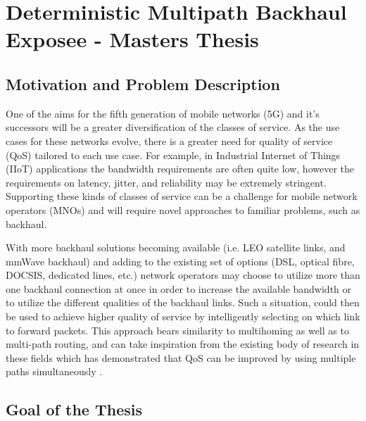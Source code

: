 
\cleardoublepage
\chapter{Deterministic Multipath Backhaul Exposee - Masters Thesis}

\label{cha:introduction}

\section{Motivation and Problem Description}
\label{sec:motivation}

One of the aims for the fifth generation of mobile networks (5G) and it's successors will be a greater diversification of the classes of service. As the use cases for these networks evolve, there is a greater need for quality of service (QoS) tailored to each use case. For example, in Industrial Internet of Things (IIoT) applications the bandwidth requirements are often quite low, however the requirements on latency, jitter, and reliability may be extremely stringent. Supporting these kinds of classes of service can be a challenge for mobile network operators (MNOs) and will require novel approaches to familiar problems, such as backhaul.

With more backhaul solutions becoming available (i.e. LEO satellite links, and mmWave backhaul) and adding to the existing set of options (DSL, optical fibre, DOCSIS, dedicated lines, etc.) network operators may choose to utilize more than one backhaul connection at once in order to increase the available bandwidth or to utilize the different qualities of the backhaul links. Such a situation, could then be used to achieve higher quality of service by intelligently selecting on which link to forward packets. This approach bears similarity to multihoming as well as to multi-path routing, and can take inspiration from the existing body of research in these fields which has demonstrated that QoS can be improved by using multiple paths simultaneously \cite{akella2003measurement, tao2005improving, habib2007improving, goldenberg2004optimizing, huang2008multiconstrained, akella2008performance}.



\section{Goal of the Thesis}
\label{sec:goal}

